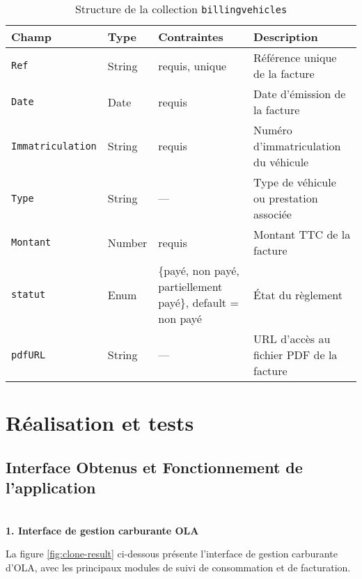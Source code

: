 \documentclass[a4paper,11pt]{report}
\begin{document}
\begin{table}[ht]
  \centering
  \small
  \caption{Structure de la collection \texttt{billingvehicles}}
  \label{tab:billingvehicles-schema}
  \begin{tabularx}{\textwidth}{l X >{\raggedright\arraybackslash}p{3cm} X}
    \toprule
    \bf Champ            & \bf Type    & \bf Contraintes                   & \bf Description                           \\
    \midrule
    \texttt{Ref}            & String     & requis, unique                   & Référence unique de la facture            \\
    \addlinespace
    \texttt{Date}           & Date       & requis                           & Date d’émission de la facture             \\
    \addlinespace
    \texttt{Immatriculation}& String     & requis                           & Numéro d’immatriculation du véhicule      \\
    \addlinespace
    \texttt{Type}           & String     & —                                & Type de véhicule ou prestation associée   \\
    \addlinespace
    \texttt{Montant}        & Number     & requis                           & Montant TTC de la facture                 \\
    \addlinespace
    \texttt{statut}         & Enum       & \{payé, non payé, partiellement payé\}, default = non payé
                                   & État du règlement                         \\
    \addlinespace
    \texttt{pdfURL}         & String     & —                                & URL d’accès au fichier PDF de la facture  \\
    \bottomrule
  \end{tabularx}
\end{table}


\newpage
\section{Réalisation et tests }
\subsection{Interface Obtenus et Fonctionnement de l'application}

\textbf{      \\ 1. Interface de gestion carburante OLA}

La figure \ref{fig:clone-result} ci-dessous présente l’interface de gestion carburante d’OLA, avec les principaux modules de suivi de consommation et de facturation.
\end{document}
